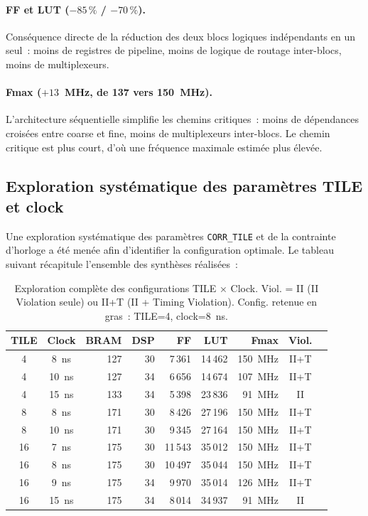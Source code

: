 \documentclass[11pt,a4paper]{article}
\begin{document}
\paragraph{FF et LUT ($-85\,\%$ / $-70\,\%$).}
Conséquence directe de la réduction des deux blocs logiques indépendants en un seul~: moins de registres de pipeline, moins de logique de routage inter-blocs, moins de multiplexeurs.

\paragraph{Fmax ($+13$~MHz, de 137 vers 150~MHz).}
L'architecture séquentielle simplifie les chemins critiques~: moins de dépendances croisées entre coarse et fine, moins de multiplexeurs inter-blocs. Le chemin critique est plus court, d'où une fréquence maximale estimée plus élevée.

\subsection{Exploration systématique des paramètres TILE et clock}

Une exploration systématique des paramètres \texttt{CORR\_TILE} et de la contrainte d'horloge a été menée afin d'identifier la configuration optimale. Le tableau suivant récapitule l'ensemble des synthèses réalisées~:

\begin{table}[H]
\centering
\renewcommand{\arraystretch}{1.3}
\begin{tabular}{ccrrrrrcc}
\toprule
\textbf{TILE} & \textbf{Clock} & \textbf{BRAM} & \textbf{DSP} & \textbf{FF} & \textbf{LUT} & \textbf{Fmax} & \textbf{Viol.} \\
\midrule
4 & 8~ns  & 127 & 30 & 7\,361  & 14\,462 & 150~MHz & II+T \\
4 & 10~ns & 127 & 34 & 6\,656  & 14\,674 & 107~MHz & II+T \\
4 & 15~ns & 133 & 34 & 5\,398  & 23\,836 &  91~MHz & II   \\
8 & 8~ns  & 171 & 30 & 8\,426  & 27\,196 & 150~MHz & II+T \\
8 & 10~ns & 171 & 30 & 9\,345  & 27\,164 & 150~MHz & II+T \\
16 & 7~ns & 175 & 30 & 11\,543 & 35\,012 & 150~MHz & II+T \\
16 & 8~ns & 175 & 30 & 10\,497 & 35\,044 & 150~MHz & II+T \\
16 & 9~ns & 175 & 34 & 9\,970  & 35\,014 & 126~MHz & II+T \\
16 & 15~ns& 175 & 34 & 8\,014  & 34\,937 &  91~MHz & II   \\
\bottomrule
\end{tabular}
\caption{Exploration complète des configurations TILE × Clock. Viol. = II (II Violation seule) ou II+T (II + Timing Violation). Config. retenue en gras~: TILE=4, clock=8~ns.}
\end{table}
\end{document}
